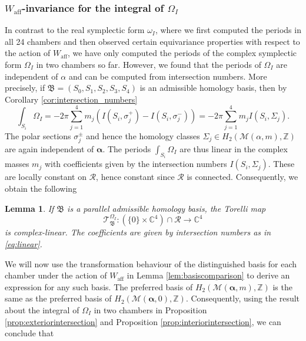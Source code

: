 \documentclass[12pt,letterpaper,reqno]{amsart}
\def\bm#1{#1}%
\def\mathbf#1{#1}%
\newtheorem{lem}[thm]{Lemma}
\theoremstyle{remark}
\theoremstyle{definition}
\numberwithin{thm}{section}
\numberwithin{equation}{section}
\numberwithin{figure}{section}
\newcommand{\cM}{\ensuremath{\mathcal M}}
\newcommand{\cT}{\ensuremath{\mathcal T}}
\newcommand{\C}{\ensuremath{\mathbb C}}
\newcommand{\Z}{\ensuremath{\mathbb Z}}
\newcommand{\bfalpha}{\ensuremath{\bm \alpha}}
\newcommand{\aff}{\mathrm{aff}}
\newcommand{\bfm}{\mathbf{m}}
\begin{document}
\subsubsection{\texorpdfstring{$W_{\mathrm{aff}}$}{Affine D4 Coxeter}-invariance for the integral of \texorpdfstring{$\Omega_I$}{the holomorphic symplectic form}}
In contrast to the real symplectic form $\omega_I$, where we first computed the periods in all 24 chambers and then observed certain equivariance properties with respect to the action of $W_\aff$, we have only computed the periods of the complex symplectic form $\Omega_I$ in two chambers so far. However, we found that the periods of $\Omega_I$ are independent of $\bfalpha$ and can be computed from intersection numbers. More precisely, if $\mathfrak{B}=(S_0, S_1, S_2, S_3, S_4)$ is an admissible homology basis, then by Corollary \ref{cor:intersection_numbers} 
\begin{equation}\label{eq:linear}
\int_{S_i} \Omega_I = -2 \pi \sum_{j=1}^4 m_j (I(S_i, \sigma_j^+) - I(S_i, \sigma_j^-)) =  -2 \pi \sum_{j=1}^4 m_j  I(S_i, \Sigma_j). 
\end{equation}
The polar sections $\sigma_j^\pm$ and hence the homology classes $\Sigma_j \in H_2( \cM(\bfalpha,\bfm),\Z)$ are again independent of $\boldsymbol{\alpha}$. The periods $\int_{S_i} \Omega_I$ are thus linear in the complex masses $m_j$ with coefficients given by the intersection numbers $I(S_i, \Sigma_j)$. These are locally constant on $\mathcal R$, hence constant since $\mathcal R$ is connected. Consequently, we obtain the following

\begin{lem}\label{lem:linear}
If $\mathfrak{B}$ is a parallel admissible homology basis, the Torelli map \[\cT^{\Omega_I}_{\mathfrak{B}}:( \{\mathbf{0}\} \times \C^4) \cap \mathcal{R} \to \C^4\] is complex-linear. The coefficients are given by intersection numbers as in \eqref{eq:linear}.
\end{lem}

We will now use the transformation behaviour of the distinguished basis for each chamber under the action of $W_\aff$ in Lemma \ref{lem:basiscomparison}  to derive an expression for any such basis. The preferred basis of $H_2(\cM(\boldsymbol{\alpha}, \mathbf{m}),\Z)$ is the same as the preferred basis of $H_2(\cM(\boldsymbol{\alpha}, \mathbf{0}),\Z)$. Consequently, using the result about the integral of $\Omega_I$ in two chambers in Proposition \ref{prop:exteriorintersection} and Proposition \ref{prop:interiorintersection}, we can conclude that
\end{document}
